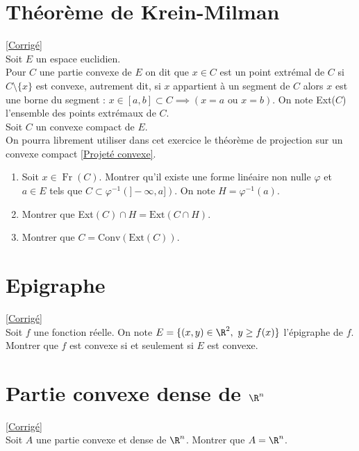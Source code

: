\documentclass{book}
\begin{document}
\section{Théorème de Krein-Milman}
\label{Théorème de Krein-Milman}
\textcolor{blue}{\hyperref[sec:theoreme-de-krein-milman]{[Corrigé]}}\\
Soit $E$ un espace euclidien.\\
Pour $C$ une partie convexe de $E$ on dit que $x\in C$ est un point extrémal de $C$ si $C\setminus \{x\}$ est convexe, autrement dit, si $x$ appartient à un segment de $C$ alors $x$ est une borne du segment : $x\in [a,b]\subset C\implies (x=a\text{ ou }x=b)$. On note Ext($C$) l'ensemble des points extrémaux de $C$.\\
Soit $C$ un convexe compact de $E$.\\
On pourra librement utiliser dans cet exercice le théorème de projection sur un convexe compact \ref{Projeté convexe}.
\begin{enumerate}
	\item Soit $x\in \operatorname{Fr}(C)$. Montrer qu'il existe une forme linéaire non nulle $\varphi$ et $a\in E$ tels que $C\subset \varphi^{-1}(]-\infty,a])$. On note $H=\varphi^{-1}(a)$.
	\item Montrer que Ext$(C)\cap H=\text{Ext}(C\cap H)$.
	\item Montrer que $C=\text{Conv}(\text{Ext}(C))$.
\end{enumerate}

\section{Epigraphe }
\label{Epigraphe}
\textcolor{blue}{\hyperref[sec:epigraphe]{[Corrigé]}}\\
Soit $f$ une fonction réelle. On note $E=\{(x,y)\in \R^2,\ y\geq f(x)\}$ l'épigraphe de $f$.\\
Montrer que $f$ est convexe si et seulement si $E$ est convexe.

\section{Partie convexe dense de $\R^n$ }
\label{Partie convexe dense de R^n}
\textcolor{blue}{\hyperref[sec:partie-convexe-dense-de-rn]{[Corrigé]}}\\
Soit $A$ une partie convexe et dense de $\R^n$. Montrer que $A=\R^n$.
\end{document}
